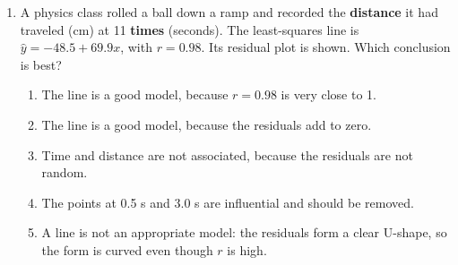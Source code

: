 \documentclass[12pt]{article}
\begin{document}
\begin{enumerate}[leftmargin=1.9em, itemsep=0.13in]
  \boxguard[14]
  \item \begin{minipage}[t]{0.50\linewidth}\raggedright
        A physics class rolled a ball down a ramp and recorded the \textbf{distance} it had
        traveled (cm) at 11 \textbf{times} (seconds). The least-squares line is
        $\hat{y} = -48.5 + 69.9x$, with $r = 0.98$. Its residual plot is shown. Which
        conclusion is best?
        \end{minipage}\hfill
        \begin{minipage}[t]{0.46\linewidth}
        \centering
        \end{minipage}
        \begin{enumerate}[label=\textbf{(\Alph*)}, leftmargin=2.2em, itemsep=2pt]
          \item The line is a good model, because $r = 0.98$ is very close to 1.
          \item The line is a good model, because the residuals add to zero.
          \item Time and distance are not associated, because the residuals are not random.
          \item The points at 0.5 s and 3.0 s are influential and should be removed.
          \item A line is not an appropriate model: the residuals form a clear U-shape, so the
                form is curved even though $r$ is high.\hfill{}\rule[-0.2in]{0pt}{0.48in}
        \end{enumerate}

\end{enumerate}
\end{document}
